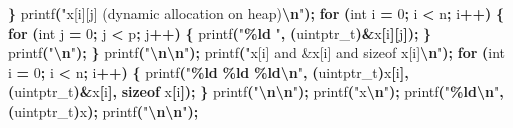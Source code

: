 \documentclass[
  12pt,
]{article}
\newenvironment{Shaded}{\begin{snugshade}}{\end{snugshade}}
\newcommand{\ControlFlowTok}[1]{\textcolor[rgb]{0.13,0.29,0.53}{\textbf{#1}}}
\newcommand{\DataTypeTok}[1]{\textcolor[rgb]{0.13,0.29,0.53}{#1}}
\newcommand{\DecValTok}[1]{\textcolor[rgb]{0.00,0.00,0.81}{#1}}
\newcommand{\KeywordTok}[1]{\textcolor[rgb]{0.13,0.29,0.53}{\textbf{#1}}}
\newcommand{\NormalTok}[1]{#1}
\newcommand{\OperatorTok}[1]{\textcolor[rgb]{0.81,0.36,0.00}{\textbf{#1}}}
\newcommand{\SpecialCharTok}[1]{\textcolor[rgb]{0.81,0.36,0.00}{\textbf{#1}}}
\newcommand{\StringTok}[1]{\textcolor[rgb]{0.31,0.60,0.02}{#1}}
\begin{document}
\begin{Shaded}
\begin{Highlighting}[]
  \OperatorTok{\}}
\NormalTok{  printf}\OperatorTok{(}\StringTok{"x[i][j] (dynamic allocation on heap)}\SpecialCharTok{\textbackslash{}n}\StringTok{"}\OperatorTok{);}
  \ControlFlowTok{for} \OperatorTok{(}\DataTypeTok{int}\NormalTok{ i }\OperatorTok{=} \DecValTok{0}\OperatorTok{;}\NormalTok{ i }\OperatorTok{\textless{}}\NormalTok{ n}\OperatorTok{;}\NormalTok{ i}\OperatorTok{++)} \OperatorTok{\{}
    \ControlFlowTok{for} \OperatorTok{(}\DataTypeTok{int}\NormalTok{ j }\OperatorTok{=} \DecValTok{0}\OperatorTok{;}\NormalTok{ j }\OperatorTok{\textless{}}\NormalTok{ p}\OperatorTok{;}\NormalTok{ j}\OperatorTok{++)} \OperatorTok{\{}
\NormalTok{      printf}\OperatorTok{(}\StringTok{"}\SpecialCharTok{\%ld}\StringTok{ "}\OperatorTok{,} \OperatorTok{(}\DataTypeTok{uintptr\_t}\OperatorTok{)\&}\NormalTok{x}\OperatorTok{[}\NormalTok{i}\OperatorTok{][}\NormalTok{j}\OperatorTok{]);}
    \OperatorTok{\}}
\NormalTok{    printf}\OperatorTok{(}\StringTok{"}\SpecialCharTok{\textbackslash{}n}\StringTok{"}\OperatorTok{);}
  \OperatorTok{\}}
\NormalTok{  printf}\OperatorTok{(}\StringTok{"}\SpecialCharTok{\textbackslash{}n\textbackslash{}n}\StringTok{"}\OperatorTok{);}
\NormalTok{  printf}\OperatorTok{(}\StringTok{"x[i] and \&x[i] and sizeof x[i]}\SpecialCharTok{\textbackslash{}n}\StringTok{"}\OperatorTok{);}
  \ControlFlowTok{for} \OperatorTok{(}\DataTypeTok{int}\NormalTok{ i }\OperatorTok{=} \DecValTok{0}\OperatorTok{;}\NormalTok{ i }\OperatorTok{\textless{}}\NormalTok{ n}\OperatorTok{;}\NormalTok{ i}\OperatorTok{++)} \OperatorTok{\{}
\NormalTok{    printf}\OperatorTok{(}\StringTok{"}\SpecialCharTok{\%ld}\StringTok{ }\SpecialCharTok{\%ld}\StringTok{ }\SpecialCharTok{\%ld\textbackslash{}n}\StringTok{"}\OperatorTok{,} \OperatorTok{(}\DataTypeTok{uintptr\_t}\OperatorTok{)}\NormalTok{x}\OperatorTok{[}\NormalTok{i}\OperatorTok{],} \OperatorTok{(}\DataTypeTok{uintptr\_t}\OperatorTok{)\&}\NormalTok{x}\OperatorTok{[}\NormalTok{i}\OperatorTok{],} \KeywordTok{sizeof}\NormalTok{ x}\OperatorTok{[}\NormalTok{i}\OperatorTok{]);}
  \OperatorTok{\}}
\NormalTok{  printf}\OperatorTok{(}\StringTok{"}\SpecialCharTok{\textbackslash{}n\textbackslash{}n}\StringTok{"}\OperatorTok{);}
\NormalTok{  printf}\OperatorTok{(}\StringTok{"x}\SpecialCharTok{\textbackslash{}n}\StringTok{"}\OperatorTok{);}
\NormalTok{  printf}\OperatorTok{(}\StringTok{"}\SpecialCharTok{\%ld\textbackslash{}n}\StringTok{"}\OperatorTok{,} \OperatorTok{(}\DataTypeTok{uintptr\_t}\OperatorTok{)}\NormalTok{x}\OperatorTok{);}
\NormalTok{  printf}\OperatorTok{(}\StringTok{"}\SpecialCharTok{\textbackslash{}n\textbackslash{}n}\StringTok{"}\OperatorTok{);}

\end{Highlighting}
\end{Shaded}
\end{document}

